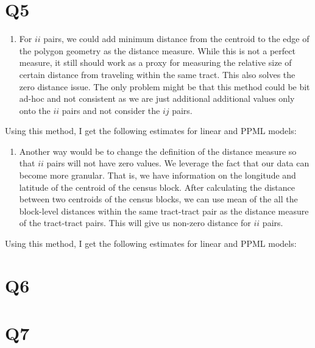 \documentclass[
  11pt]{article}
\providecommand{\tightlist}{%
  \setlength{\itemsep}{0pt}\setlength{\parskip}{0pt}}
\begin{document}
\section*{Q5}\label{q5}

\begin{enumerate}
\def\labelenumi{\arabic{enumi}.}
\tightlist
\item
  For \(ii\) pairs, we could add minimum distance from the centroid to
  the edge of the polygon geometry as the distance measure. While this
  is not a perfect measure, it still should work as a proxy for
  measuring the relative size of certain distance from traveling within
  the same tract. This also solves the zero distance issue. The only
  problem might be that this method could be bit ad-hoc and not
  consistent as we are just additional additional values only onto the
  \(ii\) pairs and not consider the \(ij\) pairs.
\end{enumerate}

Using this method, I get the following estimates for linear and PPML
models:

\begin{enumerate}
\def\labelenumi{\arabic{enumi}.}
\setcounter{enumi}{1}
\tightlist
\item
  Another way would be to change the definition of the distance measure
  so that \(ii\) pairs will not have zero values. We leverage the fact
  that our data can become more granular. That is, we have information
  on the longitude and latitude of the centroid of the census block.
  After calculating the distance between two centroids of the census
  blocks, we can use mean of the all the block-level distances within
  the same tract-tract pair as the distance measure of the tract-tract
  pairs. This will give us non-zero distance for \(ii\) pairs.
\end{enumerate}

Using this method, I get the following estimates for linear and PPML
models:

\section*{Q6}\label{q6}

\section*{Q7}\label{q7}
\end{document}
